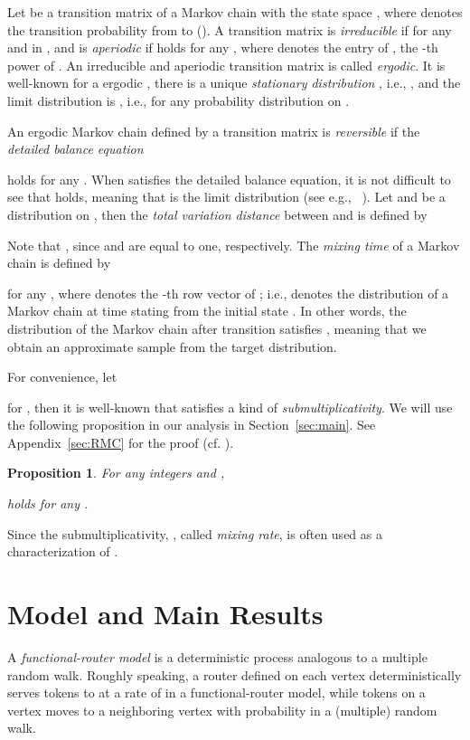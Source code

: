 \documentclass[letter, 11pt]{article}
\newcommand{\shortqed}{\hfill \mbox{} \smallskip}
\newcommand{\1}{\mbox{1}\hspace{-0.25em}\mbox{l}}
\newtheorem{proposition}[theorem]{Proposition}
\begin{document}
Let  be 
   a transition matrix of a Markov chain with the state space , 
  where  denotes the transition probability from  to  (). 
A transition matrix  is {\em irreducible} if  for any  and  in , and 
  is {\em aperiodic} if  holds for any , 
  where  denotes the  entry of , the -th power of . 
 An irreducible and aperiodic transition matrix is called {\em ergodic}. 
It is well-known for a ergodic , 
  there is a unique {\em stationary distribution} , 
   i.e., , 
  and the limit distribution is , 
   i.e.,  for any probability distribution  on . 

An ergodic Markov chain defined by a transition matrix  is {\em reversible} 
  if the {\em detailed balance equation} 

  holds for any . 
 When  satisfies the detailed balance equation, 
  it is not difficult to see that  holds, 
  meaning that  is the limit distribution (see e.g., ~\cite{LPW08}). 
Let  and  be a distribution on , 
then the {\em total variation distance}  between  and  is defined  by  

 Note that , since  and  are equal to one, respectively. 
The {\em mixing time} of a Markov chain is defined by 

 for any , 
  where   denotes the -th row vector of ; 
  i.e.,  denotes the distribution of 
   a Markov chain at time  
   stating from the initial state . 
In other words, 
   the distribution  of the Markov chain after  transition 
   satisfies , 
  meaning that we obtain an approximate sample from the target distribution. 

For convenience, let
  
 for , then 
 it is well-known that 
   satisfies a kind of {\em submultiplicativity}. 
 We will use the following proposition in our analysis in Section~\ref{sec:main}. 
 See Appendix~\ref{sec:RMC} for the proof (cf. \cite{LPW08,MT06}). 
\begin{proposition}\label{prop:dltimes}
  For any integers    and 
   , 

 holds for any  . 
\shortqed
\end{proposition} 
Since the submultiplicativity, , called {\em mixing rate}, is often used as a characterization of . 

\section{Model and Main Results}\label{sec:modelresult}A {\em functional-router model} is 
   a  deterministic process analogous to a multiple random walk. 
 Roughly speaking, 
  a router defined on each vertex  deterministically serves tokens to  
  at a rate of  in a functional-router model, 
  while tokens on a vertex  moves to a neighboring vertex  with probability  in a (multiple) random walk.
\end{document}
